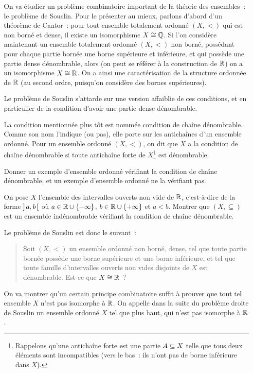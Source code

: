 \begin{problem}\label{pb.souslin}
  On va étudier un problème combinatoire important de la théorie des ensembles~:
  le problème de Souslin. Pour le présenter au mieux, parlons d'abord d'un
  théorème de Cantor~: pour tout ensemble totalement ordonné $(X,<)$ qui est non
  borné et dense, il existe un isomorphisme $X \cong \mathbb Q$. Si l'on considère
  maintenant un ensemble totalement ordonné $(X,<)$ non borné, possédant pour
  chaque partie bornée une borne supérieure et inférieure, et qui possède une
  partie dense dénombrable, alors (on peut se référer à la construction de
  $\mathbb R$) on a un isomorphisme $X\cong \mathbb R$. On a ainsi une caractérisation de la
  structure ordonnée de $\mathbb R$ (au second ordre, puisqu'on considère des bornes
  supérieures).

  Le problème de Souslin s'attarde sur une version affaiblie de ces conditions,
  et en particulier de la condition d'avoir une partie dense dénombrable.


  La condition mentionnée plus tôt est nommée \og condition de chaîne
  dénombrable\fg{}. Comme son nom l'indique (ou pas), elle porte sur les
  antichaînes d'un ensemble ordonné. Pour un ensemble ordonné $(X,<)$, on dit
  que $X$ a la condition de chaîne dénombrable si toute antichaîne forte de
  $X$\footnote{Rappelons qu'une antichaîne forte est une partie
  $A\subseteq X$ telle que tous deux éléments sont incompatibles (vers le
  bas~: ils n'ont pas de borne inférieure dans $X$).} est
  dénombrable.

  \begin{pbQuest}
  \item Donner un exemple d'ensemble ordonné vérifiant la condition de chaîne
    dénombrable, et un exemple d'ensemble ordonné ne la vérifiant pas.
  \item On pose $X$ l'ensemble des intervalles ouverts non vide de $\mathbb R$,
    c'est-à-dire de la forme $\mathord{\left]\,a,b\,\right[}$ où $a\in \mathbb R\cup\{\mathord{-}\infty\}$,
    $b \in \mathbb R\cup\{\mathord{+}\infty\}$ et $a < b$. Montrer que $(X,\subseteq)$ est un
    ensemble indénombrable vérifiant la condition de chaîne dénombrable.
  \end{pbQuest}

  Le problème de Souslin est donc le suivant~:
  \begin{quotation}
    \noindent
    Soit $(X,<)$ un ensemble ordonné non borné, dense, tel que toute partie
    bornée possède une borne supérieure et une borne inférieure, et tel que
    toute famille d'intervalles ouverts non vides disjoints de $X$ est
    dénombrable. Est-ce que $X\cong\mathbb R$~?
  \end{quotation}
  On va montrer qu'un certain principe combinatoire suffit à prouver que tout
  tel ensemble $X$ n'est pas isomorphe à $\mathbb R$. On appelle dans la suite du
  problème \og droite de Souslin\fg{} un ensemble ordonné $X$ tel que plus haut,
  qui n'est pas isomorphe à $\mathbb R$.


\end{problem}

